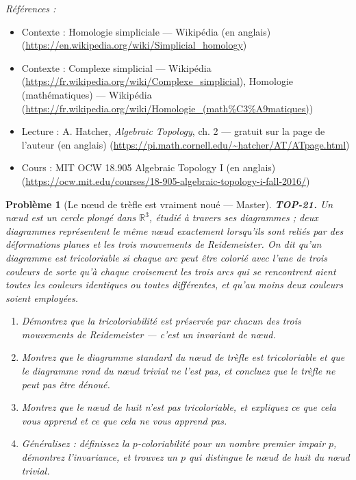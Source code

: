 \documentclass[11pt]{article}
\newtheorem{problem}{Problème}
\newenvironment{refs}{\par\small\noindent\emph{Références :}\begin{itemize}\setlength\itemsep{0pt}}{\end{itemize}\normalsize}
\begin{document}
\begin{refs}
\item Contexte : Homologie simpliciale --- Wikipédia (en anglais) (\url{https://en.wikipedia.org/wiki/Simplicial_homology})
\item Contexte : Complexe simplicial --- Wikipédia (\url{https://fr.wikipedia.org/wiki/Complexe_simplicial}), Homologie (mathématiques) --- Wikipédia (\url{https://fr.wikipedia.org/wiki/Homologie_(math%C3%A9matiques)})
\item Lecture : A. Hatcher, \textit{Algebraic Topology}, ch. 2 --- gratuit sur la page de l'auteur (en anglais) (\url{https://pi.math.cornell.edu/~hatcher/AT/ATpage.html})
\item Cours : MIT OCW 18.905 Algebraic Topology I (en anglais) (\url{https://ocw.mit.edu/courses/18-905-algebraic-topology-i-fall-2016/})
\end{refs}

\bigskip

\begin{problem}[{Le n\oe{}ud de trèfle est vraiment noué --- Master}]
\textbf{TOP-21.} Un n\oe{}ud est un cercle plongé dans $ \mathbb{R}^3 $, étudié à travers ses
diagrammes ; deux diagrammes représentent le même n\oe{}ud exactement lorsqu'ils sont reliés par des
déformations planes et les trois mouvements de Reidemeister. On dit qu'un diagramme est
\textit{tricoloriable} si chaque arc peut être colorié avec l'une de trois couleurs de sorte qu'à chaque
croisement les trois arcs qui se rencontrent aient toutes les couleurs identiques ou toutes différentes,
et qu'au moins deux couleurs soient employées.
\begin{enumerate}
\item[(a)] Démontrez que la tricoloriabilité est préservée par chacun des trois mouvements de Reidemeister ---
c'est un invariant de n\oe{}ud.
\item[(b)] Montrez que le diagramme standard du n\oe{}ud de trèfle est tricoloriable et que le diagramme rond du
n\oe{}ud trivial ne l'est pas, et concluez que le trèfle ne peut pas être dénoué.
\item[(c)] Montrez que le n\oe{}ud de huit n'est \textit{pas} tricoloriable, et expliquez ce que cela vous apprend
et ce que cela ne vous apprend pas.
\item[(d)] Généralisez : définissez la $ p $-coloriabilité pour un nombre premier impair $ p $, démontrez
l'invariance, et trouvez un $ p $ qui distingue le n\oe{}ud de huit du n\oe{}ud trivial.
\end{enumerate}

\end{problem}
\end{document}
